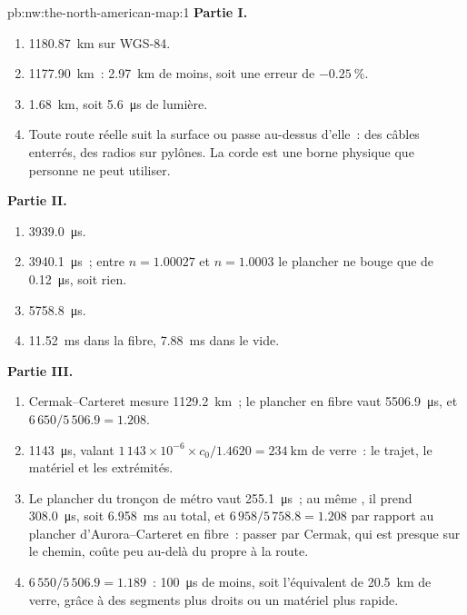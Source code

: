 \begin{solution}{pb:nw:the-north-american-map:1}
\textbf{Partie I.}
\begin{enumerate}
\item \qty{1180.87}{\kilo\metre} sur WGS-84.
\item \qty{1177.90}{\kilo\metre}~: \qty{2.97}{\kilo\metre} de moins, soit une erreur de $-0.25~\%$.
\item \qty{1.68}{\kilo\metre}, soit \qty{5.6}{\micro\second} de lumière.
\item Toute route réelle suit la surface ou passe au-dessus d'elle~: des câbles enterrés, des radios sur pylônes. La corde est une borne physique que personne ne peut utiliser.
\end{enumerate}
\textbf{Partie II.}
\begin{enumerate}[resume]
\item \qty{3939.0}{\micro\second}.
\item \qty{3940.1}{\micro\second}~; entre $n = 1.00027$ et $n = 1.0003$ le plancher ne bouge que de \qty{0.12}{\micro\second}, soit rien.
\item \qty{5758.8}{\micro\second}.
\item \qty{11.52}{\milli\second} dans la fibre, \qty{7.88}{\milli\second} dans le vide.
\end{enumerate}
\textbf{Partie III.}
\begin{enumerate}[resume]
\item Cermak--Carteret mesure \qty{1129.2}{\kilo\metre}~; le plancher en fibre vaut \qty{5506.9}{\micro\second}, et $6\,650/5\,506.9 = 1.208$.
\item \qty{1143}{\micro\second}, valant $1\,143 \times 10^{-6} \times c_0/1.4620 = \qty{234}{\kilo\metre}$ de verre~: le trajet, le matériel et les extrémités.
\item Le plancher du tronçon de métro vaut \qty{255.1}{\micro\second}~; au même , il prend \qty{308.0}{\micro\second}, soit
\qty{6.958}{\milli\second} au total, et $6\,958/5\,758.8 = 1.208$ par rapport au plancher d'Aurora--Carteret en fibre~: passer par Cermak, qui
est presque sur le chemin, coûte peu au-delà du  propre à la route.
\item $6\,550/5\,506.9 = 1.189$~: \qty{100}{\micro\second} de moins, soit l'équivalent de \qty{20.5}{\kilo\metre} de verre, grâce à des segments plus droits ou
un matériel plus rapide.
\end{enumerate}

\end{solution}

